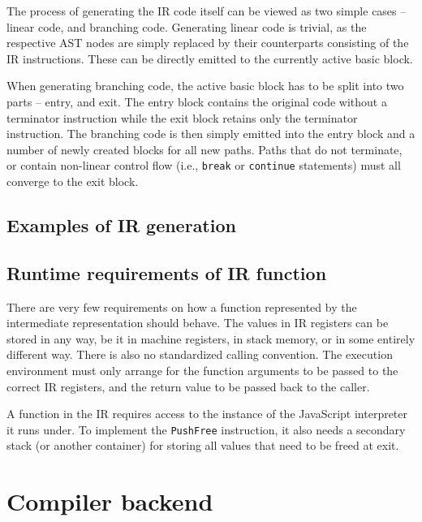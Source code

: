 The process of generating the IR code itself can be viewed as two simple cases -- linear code, and branching code. Generating linear code is trivial, as the respective AST nodes are simply replaced by their counterparts consisting of the IR instructions. These can be directly emitted to the currently active basic block.

When generating branching code, the active basic block has to be split into two parts -- entry, and exit. The entry block contains the original code without a terminator instruction while the exit block retains only the terminator instruction. The branching code is then simply emitted into the entry block and a number of newly created blocks for all new paths. Paths that do not terminate, or contain non-linear control flow (i.e., \texttt{break} or \texttt{continue} statements) must all converge to the exit block.

\subsection{Examples of IR generation}


\subsection{Runtime requirements of IR function}\label{subsec:irruntime}

There are very few requirements on how a function represented by the intermediate representation should behave. The values in IR registers can be stored in any way, be it in machine registers, in stack memory, or in some entirely different way. There is also no standardized calling convention. The execution environment must only arrange for the function arguments to be passed to the correct IR registers, and the return value to be passed back to the caller.

A function in the IR requires access to the instance of the JavaScript interpreter it runs under. To implement the \texttt{PushFree} instruction, it also needs a secondary stack (or another container) for storing all values that need to be freed at exit.


\section{Compiler backend}

